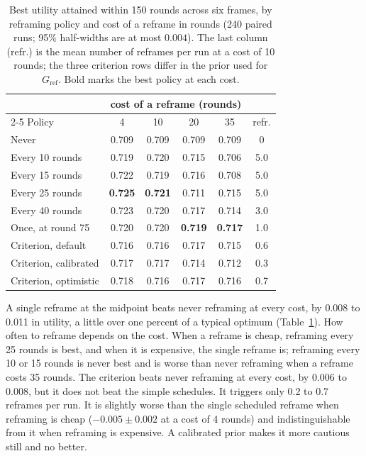 \documentclass[10pt,twocolumn]{article}
\theoremstyle{definition}
\begin{document}
\begin{table}[t]
\caption{Best utility attained within 150 rounds across six frames, by reframing policy and cost of a reframe in rounds (240 paired runs; 95\% half-widths are at most $0.004$). The last column (refr.) is the mean number of reframes per run at a cost of 10 rounds; the three criterion rows differ in the prior used for $G_{\mathrm{ref}}$. Bold marks the best policy at each cost.}
\label{tab:reframe}
\centering\small
\setlength{\tabcolsep}{3.4pt}
\begin{tabular}{@{}lccccc@{}}
\toprule
& \multicolumn{4}{c}{cost of a reframe (rounds)} & \\
\cmidrule(lr){2-5}
Policy & 4 & 10 & 20 & 35 & refr.\\
\midrule
Never & 0.709 & 0.709 & 0.709 & 0.709 & 0\\
\addlinespace[2pt]
Every 10 rounds & 0.719 & 0.720 & 0.715 & 0.706 & 5.0\\
Every 15 rounds & 0.722 & 0.719 & 0.716 & 0.708 & 5.0\\
Every 25 rounds & \textbf{0.725} & \textbf{0.721} & 0.711 & 0.715 & 5.0\\
Every 40 rounds & 0.723 & 0.720 & 0.717 & 0.714 & 3.0\\
Once, at round 75 & 0.720 & 0.720 & \textbf{0.719} & \textbf{0.717} & 1.0\\
\addlinespace[2pt]
Criterion, default & 0.716 & 0.716 & 0.717 & 0.715 & 0.6\\
Criterion, calibrated & 0.717 & 0.717 & 0.714 & 0.712 & 0.3\\
Criterion, optimistic & 0.718 & 0.716 & 0.717 & 0.716 & 0.7\\
\bottomrule
\end{tabular}
\end{table}

A single reframe at the midpoint beats never reframing at every cost, by 0.008 to 0.011 in utility, a little over one percent of a typical optimum (Table~\ref{tab:reframe}). How often to reframe depends on the cost. When a reframe is cheap, reframing every 25 rounds is best, and when it is expensive, the single reframe is; reframing every 10 or 15 rounds is never best and is worse than never reframing when a reframe costs 35 rounds. The criterion beats never reframing at every cost, by $0.006$ to $0.008$, but it does not beat the simple schedules. It triggers only 0.2 to 0.7 reframes per run. It is slightly worse than the single scheduled reframe when reframing is cheap ($-0.005\pm0.002$ at a cost of 4 rounds) and indistinguishable from it when reframing is expensive. A calibrated prior makes it more cautious still and no better.
\end{document}
